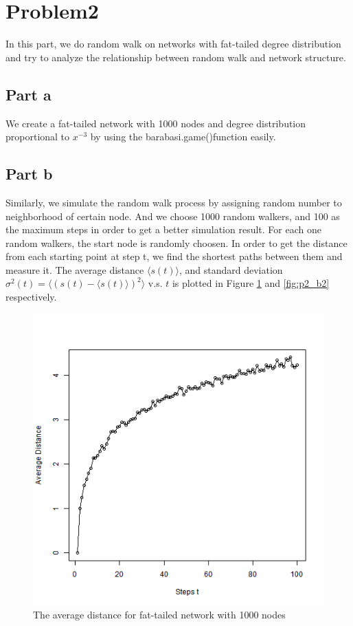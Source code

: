 \documentclass{article}
\begin{document}
\section{Problem2}\label{prob:p2}
In this part, we do random walk on networks with fat-tailed degree distribution
and try to analyze the relationship between random walk and network structure.

\subsection{Part a}
We create a fat-tailed network with 1000 nodes and degree distribution proportional to $x^{−3}$ by using the barabasi.game()function easily.

\subsection{Part b}
Similarly, we simulate the random walk process by assigning random number to neighborhood of certain node. And we choose 1000 random walkers, and 100 as the maximum steps in order to get a better simulation result. For each one random walkers, the start node is randomly choosen. In order to get the distance from each starting point at step t, we find the shortest paths between them and measure it. The average distance $\langle s(t)\rangle$, and standard deviation $\sigma^2(t)=\langle (s(t)-\langle s(t)\rangle)^2\rangle$ v.s. $t$ is plotted in Figure \ref{fig:p2_b1} and \ref{fig:p2_b2} respectively.
\begin{figure}[htbp]
\centering
\includegraphics[width=.6\textwidth]{Q2b_1.png}
\caption{The average distance for fat-tailed network with 1000 nodes}
\label{fig:p2_b1}
\end{figure}\\
\end{document}

